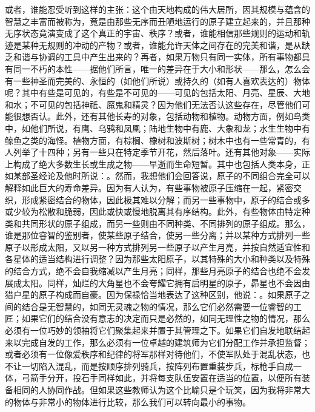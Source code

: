或者，谁能忍受听到这样的主张：这个由天地构成的伟大居所，因其规模与蕴含的智慧之丰富而被称为，竟是由那些无序而丑陋地运行的原子建立起来的，并且那种无序状态竟演变成了这个真正的宇宙、秩序？或者，谁能相信那些规则的运动和轨迹是某种无规则的冲动的产物？或者，谁能允许天体之间存在的完美和谐，是从缺乏和谐与协调的工具中产生出来的？再者，如果万物只有同一实体，所有事物都具有同一不朽的本性——据他们所言，唯一的差异在于大小和形状——那么，怎么会有一些神圣而完美的、永恒的（如他们所说）或持久的（如有人喜欢表达的）物体呢？其中有些是可见的，有些是不可见的——可见的包括太阳、月亮、星辰、大地和水；不可见的包括神祇、魔鬼和精灵？因为他们无法否认这些存在，尽管他们可能很想否认。此外，还有其他长寿的对象，包括动物和植物。动物方面，例如鸟类中，如他们所说，有鹰、乌鸦和凤凰；陆地生物中有鹿、大象和龙；水生生物中有鲸鱼之类的海怪。植物方面，有棕榈、橡树和波斯树；树木中也有一些常青的，有人列举了十四种；另有一些只在特定季节开花，然后落叶。还有其他对象——实际上构成了绝大多数生长或生成之物——早逝而生命短暂。其中也包括人类本身，正如某部圣经论及他时所说：。然而，我想他们会回答说，原子的不同组合完全可以解释如此巨大的寿命差异。因为有人认为，有些事物被原子压缩在一起，紧密交织，形成紧密结合的物体，因此极其难以分解；而另一些事物中，原子的结合或多或少较为松散和脆弱，因此或快或慢地脱离其有序结构。此外，有些物体由特定种类和共同形状的原子组成，而另一些则由不同种类、不同排列的原子组成。那么，谁是那位睿智的鉴别者，使某些原子结合，使另一些分离；并以某种方式排列一些原子以形成太阳，又以另一种方式排列另一些原子以产生月亮，并按自然适宜性和各星体的适当结构进行调整？因为那些太阳原子，以其特殊的大小和种类以及特殊的结合方式，绝不会自我缩减以产生月亮；同样，那些月亮原子的结合也绝不会发展成太阳。同样，灿烂的大角星也不会夸耀它拥有启明星的原子，昴星也不会因由猎户星的原子构成而自豪。因为保禄恰当地表达了这种区别，他说：。如果原子之间的结合是无智慧的，如同无灵魂之物的情况，那么它们必然需要一位睿智的工匠；如果它们的结合没有意志的决定而只是必然的，如同无理性之物的情况，那么必须有一位巧妙的领袖将它们聚集起来并置于其管理之下。如果它们自发地联结起来以完成自发的工作，那么必须有一位卓越的建筑师为它们分配工作并承担监督；或者必须有一位像爱秩序和纪律的将军那样对待他们，不使军队处于混乱状态，也不让一切陷入混乱，而是按顺序排列骑兵，按阵列布置重装步兵，标枪手自成一体，弓箭手分开，投石手同样如此，并将每支队伍安置在适当的位置，以便所有装备相同的人协同作战。但如果这些教师认为这个比喻只是个玩笑，因为我将非常大的物体与非常小的物体进行比较，那么我们可以转向最小的事物。\par

